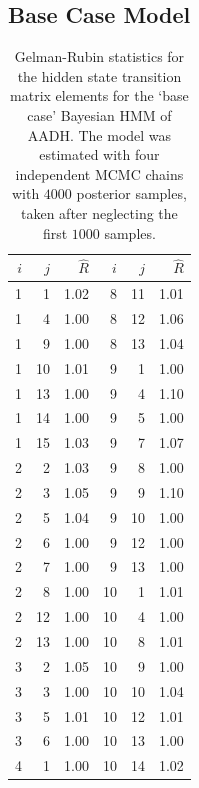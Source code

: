 \subsection{Base Case Model}
\begin{table}
    \centering
    \caption{Gelman-Rubin statistics for the hidden state transition matrix elements for the `base case' Bayesian HMM of AADH. The model was estimated with four independent MCMC chains with $4000$ posterior samples, taken after neglecting the first $1000$ samples. }
    \label{tab:aadh_base_case_rhat}
    \begin{tabular}{|r|r|r||r|r|r|}
    \hline
    $i$ & $j$ & $\hat{R}$ & $i$ & $j$ & $\hat{R}$ \\
    \hline\hline
      1 &   1 &      1.02 &   8 &  11 &      1.01 \\
      1 &   4 &      1.00 &   8 &  12 &      1.06 \\
      1 &   9 &      1.00 &   8 &  13 &      1.04 \\
      1 &  10 &      1.01 &   9 &   1 &      1.00 \\
      1 &  13 &      1.00 &   9 &   4 &      1.10 \\
      1 &  14 &      1.00 &   9 &   5 &      1.00 \\
      1 &  15 &      1.03 &   9 &   7 &      1.07 \\
      2 &   2 &      1.03 &   9 &   8 &      1.00 \\
      2 &   3 &      1.05 &   9 &   9 &      1.10 \\
      2 &   5 &      1.04 &   9 &  10 &      1.00 \\
      2 &   6 &      1.00 &   9 &  12 &      1.00 \\
      2 &   7 &      1.00 &   9 &  13 &      1.00 \\
      2 &   8 &      1.00 &  10 &   1 &      1.01 \\
      2 &  12 &      1.00 &  10 &   4 &      1.00 \\
      2 &  13 &      1.00 &  10 &   8 &      1.01 \\
      3 &   2 &      1.05 &  10 &   9 &      1.00 \\
      3 &   3 &      1.00 &  10 &  10 &      1.04 \\
      3 &   5 &      1.01 &  10 &  12 &      1.01 \\
      3 &   6 &      1.00 &  10 &  13 &      1.00 \\
      4 &   1 &      1.00 &  10 &  14 &      1.02 \\

\end{tabular}
\end{table}
